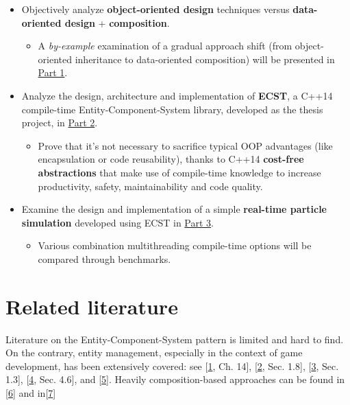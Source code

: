 \documentclass[twoside, 12pt, a4paper, openany]{book}
\providecommand{\tightlist}{%
  \setlength{\itemsep}{0pt}\setlength{\parskip}{0pt}}
\begin{document}
\begin{itemize}
\item
  Objectively analyze \textbf{object-oriented design} techniques versus
  \textbf{data-oriented design} + \textbf{composition}.

  \begin{itemize}
  \tightlist
  \item
    A \emph{by-example} examination of a gradual approach shift (from
    object-oriented inheritance to data-oriented composition) will be
    presented in \protect\hyperlink{ecs_part_overview}{Part 1}.
  \end{itemize}
\item
  Analyze the design, architecture and implementation of \textbf{ECST},
  a C++14 compile-time Entity-Component-System library, developed as the
  thesis project, in \protect\hyperlink{part2_ecst}{Part 2}.

  \begin{itemize}
  \tightlist
  \item
    Prove that it's not necessary to sacrifice typical OOP advantages
    (like encapsulation or code reusability), thanks to C++14
    \textbf{cost-free abstractions} that make use of compile-time
    knowledge to increase productivity, safety, maintainability and code
    quality.
  \end{itemize}
\item
  Examine the design and implementation of a simple \textbf{real-time
  particle simulation} developed using ECST in
  \protect\hyperlink{part3_sim}{Part 3}.

  \begin{itemize}
  \tightlist
  \item
    Various combination multithreading compile-time options will be
    compared through benchmarks.
  \end{itemize}
\end{itemize}

\section{Related literature}\label{related-literature}

Literature on the Entity-Component-System pattern is limited and hard to
find. On the contrary, entity management, especially in the context of
game development, has been extensively covered: see
{[}\protect\hyperlink{ref-gregory2014game}{1}, Ch. 14{]},
{[}\protect\hyperlink{ref-game_programming_gems_4}{2}, Sec. 1.8{]},
{[}\protect\hyperlink{ref-game_programming_gems_5}{3}, Sec. 1.3{]},
{[}\protect\hyperlink{ref-game_programming_gems_6}{4}, Sec. 4.6{]}, and
{[}\protect\hyperlink{ref-doherty2003software}{5}{]}. Heavily
composition-based approaches can be found in
{[}\protect\hyperlink{ref-Wiebusch:2012}{6}{]} and
in{[}\protect\hyperlink{ref-6658092}{7}{]}
\end{document}
